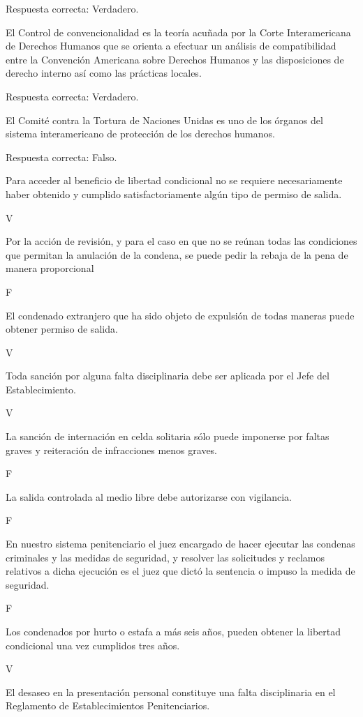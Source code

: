 \documentclass[letterpaper, 11pt]{article}
\begin{document}
Respuesta correcta: Verdadero.

El Control de convencionalidad es la teoría acuñada por la Corte Interamericana de
Derechos Humanos que se orienta a efectuar un análisis de compatibilidad entre la
Convención Americana sobre Derechos Humanos y las disposiciones de derecho interno
así como las prácticas locales.

Respuesta correcta: Verdadero.

El Comité contra la Tortura de Naciones Unidas es uno de los órganos del sistema
interamericano de protección de los derechos humanos.

Respuesta correcta: Falso.


Para acceder al beneficio de libertad condicional no se requiere
necesariamente haber obtenido y cumplido satisfactoriamente algún tipo de
permiso de salida.

V

Por la acción de revisión, y para el caso en que no se reúnan todas las
condiciones que permitan la anulación de la condena, se puede pedir la
rebaja de la pena de manera proporcional

F

El condenado extranjero que ha sido objeto de expulsión de todas maneras
puede obtener permiso de salida.

V

Toda sanción por alguna falta disciplinaria debe ser aplicada por el Jefe del
Establecimiento.

V

La sanción de internación en celda solitaria sólo puede imponerse por faltas
graves y reiteración de infracciones menos graves.

F

La salida controlada al medio libre debe autorizarse con vigilancia.

F

En nuestro sistema penitenciario el juez encargado de hacer ejecutar las
condenas criminales y las medidas de seguridad, y resolver las solicitudes y
reclamos relativos a dicha ejecución es el juez que dictó la sentencia o impuso
la medida de seguridad.

F

Los condenados por hurto o estafa a más seis años, pueden obtener la libertad
condicional una vez cumplidos tres años.

V

El desaseo en la presentación personal constituye una falta disciplinaria en el
Reglamento de Establecimientos Penitenciarios.
\end{document}
